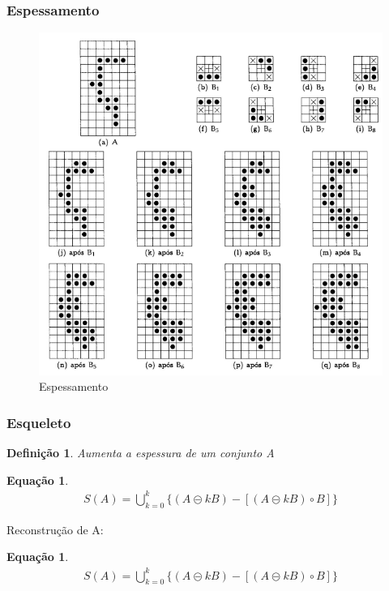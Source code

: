 \documentclass[aspectratio=169]{beamer}
\theoremstyle{Definition}
\newtheorem{defn}{Defini\c c\~ao}
\newtheorem{eq}[theorem]{Equa\c c\~ao}
\begin{document}
\begin{frame}
	\frametitle{Espessamento}
	
	\begin{figure}[h]
	 	\includegraphics[width=0.6\paperwidth,height=0.6\paperheight]{imagens/espessamento}
		\caption{Espessamento}\label{figLogical}
	\end{figure}
	
\end{frame}

\begin{frame}
	\frametitle{Esqueleto}
	
	\begin{defn}
		Aumenta a espessura de um conjunto A
	\end{defn}
	
	\begin{eq}
		\begin{align*}
				S(A) = \bigcup^k_{k=0} \{ (A \circleddash kB) - [(A \circleddash kB) \circ B] \}
		\end{align*}
	\end{eq}
	
	Reconstrução de A:
	
	\begin{eq}
		\begin{align}
				S(A) = \bigcup^k_{k=0} \{ (A \circleddash kB) - [(A \circleddash kB) \circ B] \}
		\end{align}
	\end{eq}
	
	
	
\end{frame}
\end{document}
